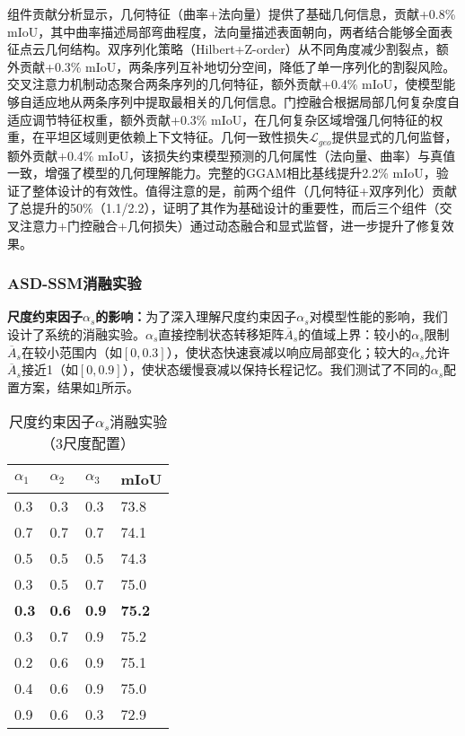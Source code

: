\documentclass[preprint,12pt]{elsarticle}
\begin{document}
组件贡献分析显示，几何特征（曲率+法向量）提供了基础几何信息，贡献+0.8\% mIoU，其中曲率描述局部弯曲程度，法向量描述表面朝向，两者结合能够全面表征点云几何结构。双序列化策略（Hilbert+Z-order）从不同角度减少割裂点，额外贡献+0.3\% mIoU，两条序列互补地切分空间，降低了单一序列化的割裂风险。交叉注意力机制动态聚合两条序列的几何特征，额外贡献+0.4\% mIoU，使模型能够自适应地从两条序列中提取最相关的几何信息。门控融合根据局部几何复杂度自适应调节特征权重，额外贡献+0.3\% mIoU，在几何复杂区域增强几何特征的权重，在平坦区域则更依赖上下文特征。几何一致性损失$\mathcal{L}_{geo}$提供显式的几何监督，额外贡献+0.4\% mIoU，该损失约束模型预测的几何属性（法向量、曲率）与真值一致，增强了模型的几何理解能力。完整的GGAM相比基线提升2.2\% mIoU，验证了整体设计的有效性。值得注意的是，前两个组件（几何特征+双序列化）贡献了总提升的50\%（1.1/2.2），证明了其作为基础设计的重要性，而后三个组件（交叉注意力+门控融合+几何损失）通过动态融合和显式监督，进一步提升了修复效果。

\subsubsection{ASD-SSM消融实验}

\textbf{尺度约束因子$\alpha_s$的影响：}为了深入理解尺度约束因子$\alpha_s$对模型性能的影响，我们设计了系统的消融实验。$\alpha_s$直接控制状态转移矩阵$\overline{A}_s$的值域上界：较小的$\alpha_s$限制$\overline{A}_s$在较小范围内（如$[0, 0.3]$），使状态快速衰减以响应局部变化；较大的$\alpha_s$允许$\overline{A}_s$接近1（如$[0, 0.9]$），使状态缓慢衰减以保持长程记忆。我们测试了不同的$\alpha_s$配置方案，结果如\cref{tab:alpha_ablation}所示。

\begin{table}[htbp!]
	\centering
	\caption{尺度约束因子$\alpha_s$消融实验（3尺度配置）}
	\label{tab:alpha_ablation}
	\begin{tabular}{@{}llll@{}}
		\toprule
		$\alpha_1$ & $\alpha_2$ & $\alpha_3$ & mIoU \\
		\midrule
		0.3 & 0.3 & 0.3 & 73.8 \\
		0.7 & 0.7 & 0.7 & 74.1 \\
		0.5 & 0.5 & 0.5 & 74.3 \\
		\midrule
		0.3 & 0.5 & 0.7 & 75.0 \\
		\textbf{0.3} & \textbf{0.6} & \textbf{0.9} & \textbf{75.2} \\
		0.3 & 0.7 & 0.9 & 75.2 \\
		0.2 & 0.6 & 0.9 & 75.1 \\
		0.4 & 0.6 & 0.9 & 75.0 \\
		\midrule
		0.9 & 0.6 & 0.3 & 72.9 \\
		\bottomrule
	\end{tabular}
\end{table}
\end{document}
